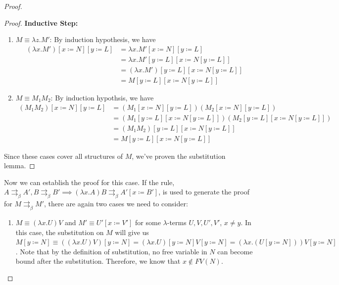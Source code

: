 \documentclass[a4paper,11pt]{article}
\theoremstyle{definition}
\theoremstyle{example}
\theoremstyle{lemma}
\newcommand{\lamterm}[2]{\lambda #1. #2}
\newcommand{\subs}[3]{#1[#2\coloneqq#3]}
\newcommand{\pbr}{\rightrightarrows_{\beta}}
\begin{document}
\begin{proof}
\begin{enumerate}[topsep=2pt,itemsep=-0.5ex,partopsep=1ex,parsep=1ex]
\begin{proof}
     \textbf{Inductive Step: }
     \vspace{-3mm}
     \begin{enumerate}[noitemsep]
         \item $M \equiv \lamterm{z}{M'}$: By induction hypothesis, we have
         \vspace{-3mm}
         \begin{align*}
         \subs{\subs{(\lamterm{x}{M'})}{x}{N}}{y}{L} &= \subs{\subs{\lamterm{x}{M'}}{x}{N}}{y}{L} \\&= \lamterm{x}{\subs{\subs{M'}{y}{L}}{x}{\subs{N}{y}{L}}} \\&= \subs{\subs{(\lamterm{x}{M'})}{y}{L}}{x}{\subs{N}{y}{L}} \\&= {\subs{\subs{M}{y}{L}}{x}{\subs{N}{y}{L}}}
         \end{align*} 
         \item $M \equiv M_1M_2$: By induction hypothsis, we have
         \vspace{-3mm}
         \begin{align*}
         \subs{\subs{(M_1M_2)}{x}{N}}{y}{L} &= (\subs{\subs{M_1}{x}{N}}{y}{L})(\subs{\subs{M_2}{x}{N}}{y}{L}) \\&= (\subs{\subs{M_1}{y}{L}}{x}{\subs{N}{y}{L}})(\subs{\subs{M_2}{y}{L}}{x}{\subs{N}{y}{L}})\\&=\subs{\subs{(M_1M_2)}{y}{L}}{x}{\subs{N}{y}{L}} \\&= \subs{\subs{M}{y}{L}}{x}{\subs{N}{y}{L}}
         \end{align*} 
     \end{enumerate}
     Since these cases cover all structures of $M$, we've proven the substitution lemma.
     \end{proof}
     \vspace{-5mm}
     Now we can establish the proof for this case. If the rule, $A \pbr A', B \pbr B' \implies (\lamterm{x}{A})B \pbr \subs{A'}{x}{B'}$, is used to generate the proof for $M \pbr M'$, there are again two cases we need to consider:

     \begin{enumerate}[topsep=-4pt,itemsep=-0.5ex,partopsep=1ex,parsep=1ex]
       \item $M \equiv (\lamterm{x}{U})V$ and $M' \equiv \subs{U'}{x}{V'}$ for some $\lambda$-terms $U, V, U', V'$, $x \neq y$. In this case, the substitution on $M$ will give us $\subs{M}{y}{N}\equiv\subs{((\lamterm{x}{U})V)}{y}{N} = \subs{(\lamterm{x}{U})}{y}{N}\subs{V}{y}{N} = (\lamterm{x}{(\subs{U}{y}{N})})\subs{V}{y}{N}$. Note that by the definition of substitution, no free variable in $N$ can become bound after the substitution. Therefore, we know that $x \notin FV(N)$. 
       

\end{enumerate}
\end{enumerate}
\end{proof}
\end{document}
